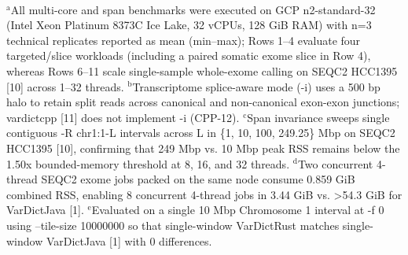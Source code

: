 \begin{table}[htbp]
\\[4pt]\footnotesize{$^{\text{a}}$All multi-core and span benchmarks were executed on GCP n2-standard-32 (Intel Xeon Platinum 8373C Ice Lake, 32 vCPUs, 128 GiB RAM) with n=3 technical replicates reported as mean (min--max); Rows 1--4 evaluate four targeted/slice workloads (including a paired somatic exome slice in Row 4), whereas Rows 6--11 scale single-sample whole-exome calling on SEQC2 HCC1395 [10] across 1--32 threads. $^{\text{b}}$Transcriptome splice-aware mode (-i) uses a 500 bp halo to retain split reads across canonical and non-canonical exon-exon junctions; vardictcpp [11] does not implement -i (CPP-12). $^{\text{c}}$Span invariance sweeps single contiguous -R chr1:1-L intervals across L in \{1, 10, 100, 249.25\} Mbp on SEQC2 HCC1395 [10], confirming that 249 Mbp vs. 10 Mbp peak RSS remains below the 1.50x bounded-memory threshold at 8, 16, and 32 threads. $^{\text{d}}$Two concurrent 4-thread SEQC2 exome jobs packed on the same node consume 0.859 GiB combined RSS, enabling 8 concurrent 4-thread jobs in 3.44 GiB vs. \textgreater{}54.3 GiB for VarDictJava [1]. $^{\text{e}}$Evaluated on a single 10 Mbp Chromosome 1 interval at -f 0 using --tile-size 10000000 so that single-window VarDictRust matches single-window VarDictJava [1] with 0 differences.}
\end{table}
